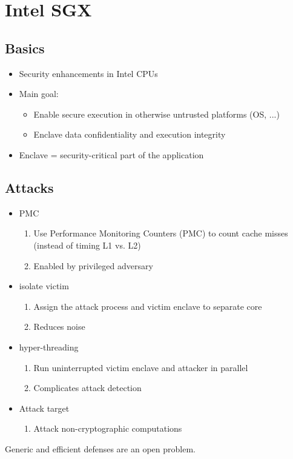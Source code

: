 
\section{Intel SGX}
\subsection{Basics}
\begin{itemize}
  \item Security enhancements in Intel CPUs
  \item Main goal:
    \begin{itemize}
      \item Enable secure execution in otherwise untrusted platforms (OS, ...)
      \item Enclave data confidentiality and execution integrity
    \end{itemize}
  \item Enclave = security-critical part of the application
\end{itemize}

\subsection{Attacks}
\begin{itemize}
  \item  PMC
    \begin{enumerate}
      \item Use Performance Monitoring Counters (PMC) to count cache misses
	(instead of timing L1 vs. L2)
      \item Enabled by privileged adversary
    \end{enumerate}
  \item  isolate victim
    \begin{enumerate}
      \item Assign the attack process and victim enclave to separate core
      \item Reduces noise
    \end{enumerate}
  \item  hyper-threading
    \begin{enumerate}
      \item Run uninterrupted victim enclave and attacker in parallel
      \item Complicates attack detection
    \end{enumerate}
  \item Attack target
    \begin{enumerate}
      \item Attack non-cryptographic computations
    \end{enumerate}
\end{itemize}
Generic and efficient defenses  are an open problem.
